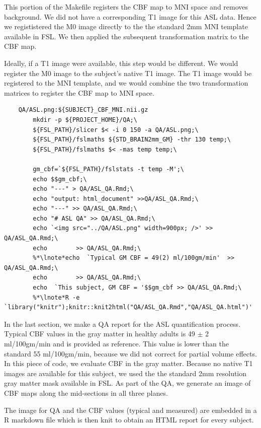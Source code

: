 This portion of the Makefile registers the CBF map to MNI space and
removes background. We did not have a corresponding T1 image for this
ASL data. Hence we regististered the M0 image directly to the the
standard 2mm MNI template available in FSL. We then applied the
subsequent transformation matrix to the CBF map. 

Ideally, if a T1 image were available, this step would be
different. We would register the M0 image to the subject's native T1
image. The T1 image would be registered to the MNI template, and we
would combine the two transformation matrices to register the CBF map
to MNI space.

\begin{lstlisting}
	QA/ASL.png:${SUBJECT}_CBF_MNI.nii.gz
		mkdir -p ${PROJECT_HOME}/QA;\
		${FSL_PATH}/slicer $< -i 0 150 -a QA/ASL.png;\
		${FSL_PATH}/fslmaths ${STD_BRAIN2mm_GM} -thr 130 temp;\
		${FSL_PATH}/fslmaths $< -mas temp temp;\
		
		gm_cbf=`${FSL_PATH}/fslstats -t temp -M';\
		echo $$gm_cbf;\
		echo "---" > QA/ASL_QA.Rmd;\
		echo "output: html_document" >>QA/ASL_QA.Rmd;\
		echo "---" >> QA/ASL_QA.Rmd;\
		echo "# ASL QA" >> QA/ASL_QA.Rmd;\
		echo `<img src="../QA/ASL.png" width=900px; />' >> QA/ASL_QA.Rmd;\
		echo        >> QA/ASL_QA.Rmd;\
		%*\lnote*echo  `Typical GM CBF = 49(2) ml/100gm/min'  >> QA/ASL_QA.Rmd;\
		echo        >> QA/ASL_QA.Rmd;\
		echo  `This subject, GM CBF = '$$gm_cbf >> QA/ASL_QA.Rmd;\
		%*\lnote*R -e `library("knitr");knitr::knit2html("QA/ASL_QA.Rmd","QA/ASL_QA.html")'

\end{lstlisting}

In the last section, we make a QA report for the ASL quantification
process.  
\lnum{6} Typical CBF values in the gray matter in healthy
adults is 49 $\pm$ 2 ml/100gm/min and is provided as reference. This
value is lower than the standard 55 ml/100gm/min, because we did not
correct for partial volume effects. In this piece of code, we evaluate
CBF in the gray matter. Because no native T1 images are available for
this subject, we used the the standard 2mm resolution gray matter mask
available in FSL. As part of the QA, we generate an image of CBF maps
along the mid-sections in all three planes.

\lnum{7} The image for QA and the
CBF values (typical and measured) are embedded in a R markdown file
which is then knit to obtain an HTML report for every subject.
